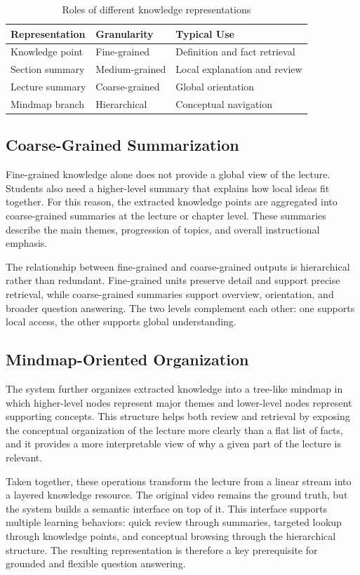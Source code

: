 \begin{table}[H]
    \centering
    \caption{Roles of different knowledge representations}
    \begin{tabular}{@{}lll@{}}
        \toprule
        \textbf{Representation} & \textbf{Granularity} & \textbf{Typical Use} \\ \midrule
        Knowledge point & Fine-grained & Definition and fact retrieval \\
        Section summary & Medium-grained & Local explanation and review \\
        Lecture summary & Coarse-grained & Global orientation \\
        Mindmap branch & Hierarchical & Conceptual navigation \\ \bottomrule
    \end{tabular}
\end{table}

\subsection{Coarse-Grained Summarization}

Fine-grained knowledge alone does not provide a global view of the lecture. Students also need a higher-level summary that explains how local ideas fit together. For this reason, the extracted knowledge points are aggregated into coarse-grained summaries at the lecture or chapter level. These summaries describe the main themes, progression of topics, and overall instructional emphasis.

The relationship between fine-grained and coarse-grained outputs is hierarchical rather than redundant. Fine-grained units preserve detail and support precise retrieval, while coarse-grained summaries support overview, orientation, and broader question answering. The two levels complement each other: one supports local access, the other supports global understanding.

\subsection{Mindmap-Oriented Organization}

The system further organizes extracted knowledge into a tree-like mindmap in which higher-level nodes represent major themes and lower-level nodes represent supporting concepts. This structure helps both review and retrieval by exposing the conceptual organization of the lecture more clearly than a flat list of facts, and it provides a more interpretable view of why a given part of the lecture is relevant.

Taken together, these operations transform the lecture from a linear stream into a layered knowledge resource. The original video remains the ground truth, but the system builds a semantic interface on top of it. This interface supports multiple learning behaviors: quick review through summaries, targeted lookup through knowledge points, and conceptual browsing through the hierarchical structure. The resulting representation is therefore a key prerequisite for grounded and flexible question answering.
